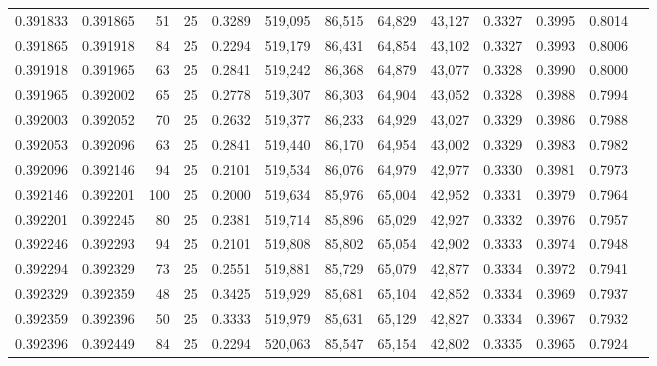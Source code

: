 \begin{tabular}{rrrrrrrrrrrrr}
0.391833 & 0.391865 &    51 &  25 &                                     0.3289 & 519,095 &  86,515 &  64,829 &  43,127 & 0.3327 & 0.3995 & 0.8014 \\
0.391865 & 0.391918 &    84 &  25 &                                     0.2294 & 519,179 &  86,431 &  64,854 &  43,102 & 0.3327 & 0.3993 & 0.8006 \\
0.391918 & 0.391965 &    63 &  25 &                                     0.2841 & 519,242 &  86,368 &  64,879 &  43,077 & 0.3328 & 0.3990 & 0.8000 \\
0.391965 & 0.392002 &    65 &  25 &                                     0.2778 & 519,307 &  86,303 &  64,904 &  43,052 & 0.3328 & 0.3988 & 0.7994 \\
0.392003 & 0.392052 &    70 &  25 &                                     0.2632 & 519,377 &  86,233 &  64,929 &  43,027 & 0.3329 & 0.3986 & 0.7988 \\
0.392053 & 0.392096 &    63 &  25 &                                     0.2841 & 519,440 &  86,170 &  64,954 &  43,002 & 0.3329 & 0.3983 & 0.7982 \\
0.392096 & 0.392146 &    94 &  25 &                                     0.2101 & 519,534 &  86,076 &  64,979 &  42,977 & 0.3330 & 0.3981 & 0.7973 \\
0.392146 & 0.392201 &   100 &  25 &                                     0.2000 & 519,634 &  85,976 &  65,004 &  42,952 & 0.3331 & 0.3979 & 0.7964 \\
0.392201 & 0.392245 &    80 &  25 &                                     0.2381 & 519,714 &  85,896 &  65,029 &  42,927 & 0.3332 & 0.3976 & 0.7957 \\
0.392246 & 0.392293 &    94 &  25 &                                     0.2101 & 519,808 &  85,802 &  65,054 &  42,902 & 0.3333 & 0.3974 & 0.7948 \\
0.392294 & 0.392329 &    73 &  25 &                                     0.2551 & 519,881 &  85,729 &  65,079 &  42,877 & 0.3334 & 0.3972 & 0.7941 \\
0.392329 & 0.392359 &    48 &  25 &                                     0.3425 & 519,929 &  85,681 &  65,104 &  42,852 & 0.3334 & 0.3969 & 0.7937 \\
0.392359 & 0.392396 &    50 &  25 &                                     0.3333 & 519,979 &  85,631 &  65,129 &  42,827 & 0.3334 & 0.3967 & 0.7932 \\
0.392396 & 0.392449 &    84 &  25 &                                     0.2294 & 520,063 &  85,547 &  65,154 &  42,802 & 0.3335 & 0.3965 & 0.7924 \\

\end{tabular}
